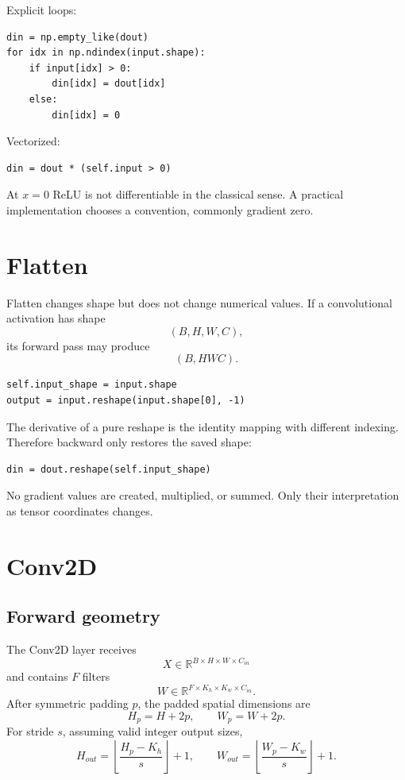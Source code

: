 \documentclass[11pt,a4paper]{article}
\newcommand{\R}{\mathbb{R}}
\begin{document}
Explicit loops:
\begin{lstlisting}
din = np.empty_like(dout)
for idx in np.ndindex(input.shape):
    if input[idx] > 0:
        din[idx] = dout[idx]
    else:
        din[idx] = 0
\end{lstlisting}

Vectorized:
\begin{lstlisting}
din = dout * (self.input > 0)
\end{lstlisting}

At $x=0$ ReLU is not differentiable in the classical sense. A practical implementation chooses a convention, commonly gradient zero.

\section{Flatten}

Flatten changes shape but does not change numerical values. If a convolutional activation has shape
\[
(B,H,W,C),
\]
its forward pass may produce
\[
(B,HWC).
\]

\begin{lstlisting}
self.input_shape = input.shape
output = input.reshape(input.shape[0], -1)
\end{lstlisting}

The derivative of a pure reshape is the identity mapping with different indexing. Therefore backward only restores the saved shape:
\begin{lstlisting}
din = dout.reshape(self.input_shape)
\end{lstlisting}

No gradient values are created, multiplied, or summed. Only their interpretation as tensor coordinates changes.

\newpage
\section{Conv2D}

\subsection{Forward geometry}

The Conv2D layer receives
\[
X\in\R^{B\times H\times W\times C_{in}}
\]
and contains $F$ filters
\[
W\in\R^{F\times K_h\times K_w\times C_{in}}.
\]
After symmetric padding $p$, the padded spatial dimensions are
\[
H_p=H+2p,\qquad W_p=W+2p.
\]
For stride $s$, assuming valid integer output sizes,
\[
H_{out}=\left\lfloor\frac{H_p-K_h}{s}\right\rfloor+1,
\qquad
W_{out}=\left\lfloor\frac{W_p-K_w}{s}\right\rfloor+1.
\]
\end{document}
